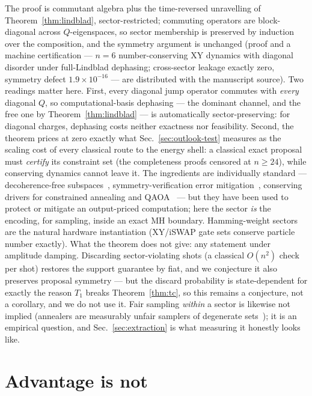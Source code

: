 \documentclass[aps,prx,reprint,floatfix,amsmath,amssymb,amsfonts]{revtex4-2}
\begin{document}
The proof is commutant algebra plus the time-reversed unravelling of
Theorem~\ref{thm:lindblad}, sector-restricted; commuting operators are
block-diagonal across $Q$-eigenspaces, so sector membership is
preserved by induction over the composition, and the symmetry argument
is unchanged (proof and a machine certification --- $n=6$ number-conserving
XY dynamics with diagonal disorder under full-Lindblad dephasing;
cross-sector leakage exactly zero, symmetry defect
$1.9\times 10^{-16}$ --- are distributed with the manuscript source).
Two readings matter here. First, every diagonal jump operator commutes
with \emph{every} diagonal $Q$, so computational-basis dephasing ---
the dominant channel, and the free one by Theorem~\ref{thm:lindblad}
--- is automatically sector-preserving: for diagonal charges, dephasing
costs neither exactness nor feasibility. Second, the theorem prices at
zero exactly what Sec.~\ref{sec:outlook-test} measures as the scaling
cost of every classical route to the energy shell: a classical exact
proposal must \emph{certify} its constraint set (the completeness
proofs censored at $n\ge 24$), while conserving dynamics cannot leave
it. The ingredients are individually standard --- decoherence-free
subspaces~\cite{Lidar1998}, symmetry-verification error
mitigation~\cite{BonetMonroig2018}, conserving drivers for constrained
annealing and QAOA~\cite{HenSpedalieri2016,Hadfield2019} --- but they
have been used to protect or mitigate an output-priced computation;
here the sector \emph{is} the encoding, for sampling, inside an exact
MH boundary. Hamming-weight sectors are the natural hardware
instantiation (XY/iSWAP gate sets conserve particle number exactly).
What the theorem does not give: any statement under amplitude damping.
Discarding sector-violating shots (a classical $O(n^2)$ check per
shot) restores the support guarantee by fiat, and we conjecture it
also preserves proposal symmetry --- but the discard probability is
state-dependent for exactly the reason $T_1$ breaks
Theorem~\ref{thm:tc}, so this remains a conjecture, not a corollary,
and we do not use it. Fair sampling \emph{within} a sector is likewise
not implied (annealers are measurably unfair samplers of degenerate
sets~\cite{Konz2019}); it is an empirical question, and
Sec.~\ref{sec:extraction} is what measuring it honestly looks like.

\section{Advantage is not}
\label{sec:advantage}
\end{document}
